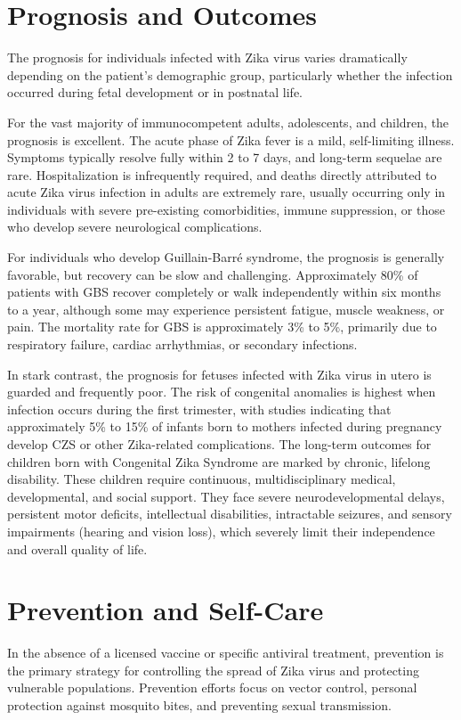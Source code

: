 \section*{Prognosis and Outcomes}
The prognosis for individuals infected with Zika virus varies dramatically depending on the patient's demographic group, particularly whether the infection occurred during fetal development or in postnatal life.

For the vast majority of immunocompetent adults, adolescents, and children, the prognosis is excellent. The acute phase of Zika fever is a mild, self-limiting illness. Symptoms typically resolve fully within 2 to 7 days, and long-term sequelae are rare. Hospitalization is infrequently required, and deaths directly attributed to acute Zika virus infection in adults are extremely rare, usually occurring only in individuals with severe pre-existing comorbidities, immune suppression, or those who develop severe neurological complications.

For individuals who develop Guillain-Barr\'e syndrome, the prognosis is generally favorable, but recovery can be slow and challenging. Approximately 80\% of patients with GBS recover completely or walk independently within six months to a year, although some may experience persistent fatigue, muscle weakness, or pain. The mortality rate for GBS is approximately 3\% to 5\%, primarily due to respiratory failure, cardiac arrhythmias, or secondary infections.

In stark contrast, the prognosis for fetuses infected with Zika virus in utero is guarded and frequently poor. The risk of congenital anomalies is highest when infection occurs during the first trimester, with studies indicating that approximately 5\% to 15\% of infants born to mothers infected during pregnancy develop CZS or other Zika-related complications. The long-term outcomes for children born with Congenital Zika Syndrome are marked by chronic, lifelong disability. These children require continuous, multidisciplinary medical, developmental, and social support. They face severe neurodevelopmental delays, persistent motor deficits, intellectual disabilities, intractable seizures, and sensory impairments (hearing and vision loss), which severely limit their independence and overall quality of life.

\section*{Prevention and Self-Care}
In the absence of a licensed vaccine or specific antiviral treatment, prevention is the primary strategy for controlling the spread of Zika virus and protecting vulnerable populations. Prevention efforts focus on vector control, personal protection against mosquito bites, and preventing sexual transmission.

